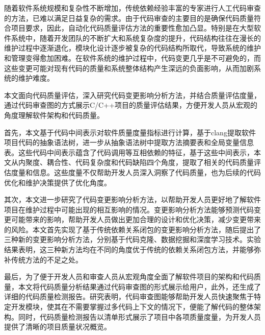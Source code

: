 \begin{cabstract}

  随着软件系统规模和复杂性不断增加，传统依赖经验丰富的专家进行人工代码审查的方法，已难以满足日益复杂的需求。由于代码审查的主要目的是确保代码质量符合项目要求，因此，自动化代码质量评估方法的重要性愈加凸显。特别是在大型软件系统中，随着开发团队的不断扩大和系统复杂度的提升，代码结构往往在漫长的维护过程中逐渐退化，模块化设计逐步被复杂的代码结构所取代，导致系统的维护和管理变得愈加困难。在软件系统的维护过程中，代码变更几乎是不可避免的，而这些变更可能对现有代码的质量和系统整体结构产生深远的负面影响，从而加剧系统的维护难度。

  本文面向代码质量评估，深入研究代码变更影响分析方法，并结合质量评估度量，通过代码审查图的方式展示C/C++项目的质量评估结果，方便开发人员从宏观的角度理解软件架构和代码质量。

  首先，本文基于代码中间表示对软件质量度量指标进行计算，基于clang提取软件项目代码的抽象语法树，进一步从抽象语法树中提取方法摘要表和全局变量信息表。这些代码中间表示蕴含了代码调用等互相依赖的特征，基于这些中间表示，本文从内聚度、耦合性、代码复杂度和代码缺陷四个角度，提取了相关的代码质量评估度量和信息。这些度量不仅帮助开发人员深入洞察了代码质量，也为后续的代码优化和维护决策提供了优化角度。

  其次，本文进一步研究了代码变更影响分析方法，以帮助开发人员更好地了解软件项目在维护过程中可能出现的相互影响的情况。变更影响分析方法能够预测代码变更可能带来的影响，帮助开发人员做出更加合理的设计和优化决策，减少变更带来的风险。本文首先实现了基于传统依赖关系闭包的变更影响分析方法，随后提出了三种新的变更影响分析方法，分别基于代码克隆、数据挖掘和深度学习技术。实验结果表明，这三种新方法均在不同的角度优于传统的依赖关系闭包方法，并能够弥补传统方法的不足之处。

  最后，为了便于开发人员和审查人员从宏观角度全面了解软件项目的架构和代码质量，本文将代码质量分析结果通过代码审查图的形式展示给用户，此外，还生成了详细的代码质量检测报告。研究表明，代码审查图能够帮助开发人员快速聚焦于特定开发模块，使其在不需要掌握过多代码上下文的情况下，便能了解代码的整体架构。同时，代码质量检测报告以清单形式展示了项目中各项质量度量，为开发人员提供了清晰的项目质量状况概览。
\end{cabstract}

